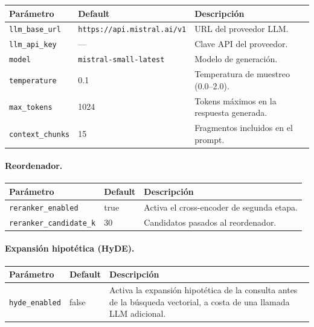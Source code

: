 \documentclass[11pt]{article}
\begin{document}
\begin{center}
\begin{tabular}{lll}
\toprule
\textbf{Parámetro} & \textbf{Default} & \textbf{Descripción} \\
\midrule
\texttt{llm\_base\_url}  & \texttt{https://api.mistral.ai/v1} & URL del proveedor LLM. \\
\texttt{llm\_api\_key}   & ---                               & Clave API del proveedor. \\
\texttt{model}           & \texttt{mistral-small-latest}     & Modelo de generación. \\
\texttt{temperature}     & 0.1  & Temperatura de muestreo (0.0--2.0). \\
\texttt{max\_tokens}     & 1024 & Tokens máximos en la respuesta generada. \\
\texttt{context\_chunks} & 15   & Fragmentos incluidos en el prompt. \\
\bottomrule
\end{tabular}
\end{center}

\paragraph{Reordenador.}

\begin{center}
\begin{tabular}{lll}
\toprule
\textbf{Parámetro} & \textbf{Default} & \textbf{Descripción} \\
\midrule
\texttt{reranker\_enabled}      & true & Activa el cross-encoder de segunda etapa. \\
\texttt{reranker\_candidate\_k} & 30   & Candidatos pasados al reordenador. \\
\bottomrule
\end{tabular}
\end{center}

\paragraph{Expansión hipotética (HyDE).}

\begin{center}
\begin{tabular}{lll}
\toprule
\textbf{Parámetro} & \textbf{Default} & \textbf{Descripción} \\
\midrule
\texttt{hyde\_enabled} & false & Activa la expansión hipotética de la consulta antes de
                                 la búsqueda vectorial, a costa de una llamada LLM adicional. \\
\bottomrule
\end{tabular}
\end{center}
\end{document}
